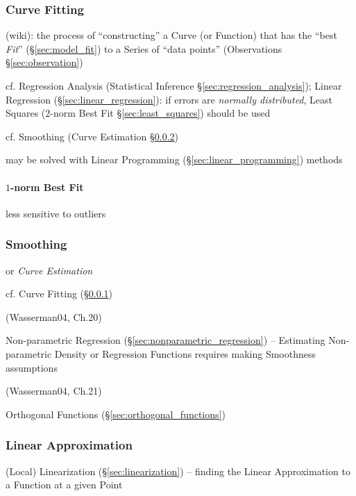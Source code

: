 \subsubsection{Curve Fitting}\label{sec:curve_fitting}

(wiki): the process of ``constructing'' a Curve (or Function) that has the
``best \emph{Fit}'' (\S\ref{sec:model_fit}) to a Series of ``data points''
(Observations \S\ref{sec:observation})

\fist cf. Regression Analysis (Statistical Inference
\S\ref{sec:regression_analysis}); Linear Regression
(\S\ref{sec:linear_regression}): if errors are \emph{normally distributed},
Least Squares ($2$-norm Best Fit \S\ref{sec:least_squares}) should be used

cf. Smoothing (Curve Estimation \S\ref{sec:smoothing})

may be solved with Linear Programming (\S\ref{sec:linear_programming}) methods



\paragraph{$1$-norm Best Fit}\label{sec:1norm_best_fit}\hfill

less sensitive to outliers



\subsubsection{Smoothing}\label{sec:smoothing}

or \emph{Curve Estimation}

cf. Curve Fitting (\S\ref{sec:curve_fitting})

(Wasserman04, Ch.20)

Non-parametric Regression (\S\ref{sec:nonparametric_regression}) -- Estimating
Non-parametric Density or Regression Functions requires making Smoothness
assumptions

(Wasserman04, Ch.21)

Orthogonal Functions (\S\ref{sec:orthogonal_functions})



\subsubsection{Linear Approximation}\label{sec:linear_approximation}

\fist (Local) Linearization (\S\ref{sec:linearization}) -- finding the Linear
Approximation to a Function at a given Point

